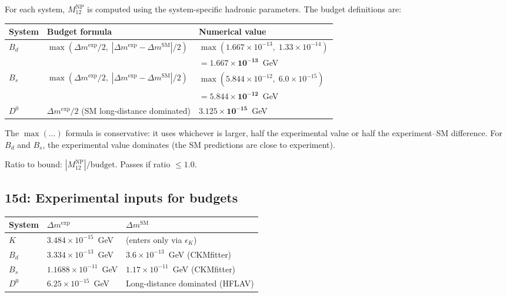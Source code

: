 \documentclass[11pt]{article}
\begin{document}
For each system, $M_{12}^{\mathrm{NP}}$ is computed using the system-specific
hadronic parameters.  The budget definitions are:

\begin{table}[h]
\centering
\begin{tabular}{@{}lll@{}}
\toprule
System & Budget formula & Numerical value \\
\midrule
$B_d$ & $\max(\Delta m^{\mathrm{exp}}/2,\;
  |\Delta m^{\mathrm{exp}} - \Delta m^{\mathrm{SM}}|/2)$
  & $\max(1.667\times10^{-13},\;1.33\times10^{-14})$ \\
  & & $= \mathbf{1.667\times10^{-13}}$~GeV \\[4pt]
$B_s$ & $\max(\Delta m^{\mathrm{exp}}/2,\;
  |\Delta m^{\mathrm{exp}} - \Delta m^{\mathrm{SM}}|/2)$
  & $\max(5.844\times10^{-12},\;6.0\times10^{-15})$ \\
  & & $= \mathbf{5.844\times10^{-12}}$~GeV \\[4pt]
$D^0$ & $\Delta m^{\mathrm{exp}}/2$ (SM long-distance dominated)
  & $\mathbf{3.125\times10^{-15}}$~GeV \\
\bottomrule
\end{tabular}
\end{table}

The $\max(\ldots)$ formula is conservative: it uses whichever is larger,
half the experimental value or half the experiment--SM difference.  For $B_d$
and $B_s$, the experimental value dominates (the SM predictions are close to
experiment).

Ratio to bound: $|M_{12}^{\mathrm{NP}}| / \text{budget}$.
Passes if ratio $\le 1.0$.

\subsection{15d: Experimental inputs for budgets}
\label{sec:step15d}

\begin{table}[h]
\centering
\begin{tabular}{@{}lll@{}}
\toprule
System & $\Delta m^{\mathrm{exp}}$ & $\Delta m^{\mathrm{SM}}$ \\
\midrule
$K$ & $3.484\times10^{-15}$~GeV & (enters only via $\epsilon_K$) \\
$B_d$ & $3.334\times10^{-13}$~GeV & $3.6\times10^{-13}$~GeV (CKMfitter) \\
$B_s$ & $1.1688\times10^{-11}$~GeV & $1.17\times10^{-11}$~GeV (CKMfitter) \\
$D^0$ & $6.25\times10^{-15}$~GeV & Long-distance dominated (HFLAV) \\
\bottomrule
\end{tabular}
\end{table}
\end{document}
